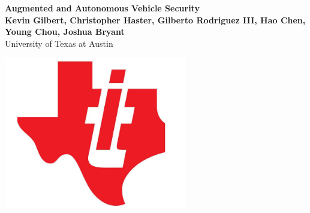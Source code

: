 \documentclass[a0,landscape]{a0poster}
\begin{document}


\begin{minipage}[b]{0.70\linewidth}
\veryHuge \color{NavyBlue} \textbf{Augmented and Autonomous Vehicle Security} \color{Black}\\ %
\huge \textbf{Kevin Gilbert, Christopher Haster, Gilberto Rodriguez III, Hao Chen, Young Chou, Joshua Bryant}\\ %
\huge University of Texas at Austin\\ 
\end{minipage}
%
\hfill\begin{minipage}[t]{0.10\linewidth}
\begin{flushright}
\includegraphics[width=8cm]{ti_logo} %
\end{flushright}

\end{minipage}
\end{document}
